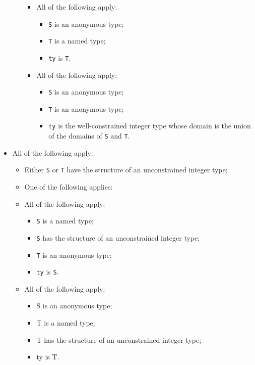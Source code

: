 \documentclass{book}
\begin{document}
\begin{itemize}
\begin{itemize}
\begin{itemize}
      \item All of the following apply:
        \begin{itemize}
        \item \texttt{S} is an anonymous type;
        \item \texttt{T} is a named type;
        \item \texttt{ty} is \texttt{T}.
        \end{itemize}

      \item All of the following apply:
        \begin{itemize}
        \item \texttt{S} is an anonymous type;
        \item \texttt{T} is an anonymous type;
	\item \texttt{ty} is the well-constrained integer type whose domain is the union of the
	  domains of \texttt{S} and \texttt{T}.      
        \end{itemize}
      \end{itemize}
    \end{itemize}

  \item All of the following apply:
    \begin{itemize}
    \item Either \texttt{S} or \texttt{T} have the structure of an unconstrained integer type;
    \item One of the following applies:

      \item All of the following apply:
        \begin{itemize}
        \item \texttt{S} is a named type;
        \item \texttt{S} has the structure of an unconstrained integer type;
        \item \texttt{T} is an anonymous type;
        \item \texttt{ty} is \texttt{S}.
        \end{itemize}

      \item All of the following apply:
        \begin{itemize}
        \item S is an anonymous type;
        \item T is a named type;
        \item T has the structure of an unconstrained integer type;
        \item ty is T.
        \end{itemize}


\end{itemize}
\end{itemize}
\end{document}
